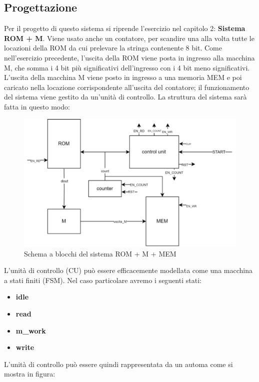 \subsection{Progettazione}
Per il progetto di questo sistema si riprende l'esercizio nel capitolo 2: \textbf{Sistema ROM + M}. Viene usato anche un contatore, per scandire una alla volta tutte le locazioni della ROM da cui prelevare la stringa contenente 8 bit. Come nell'esercizio precedente, l'uscita della ROM viene posta in ingresso alla macchina M, che somma i 4 bit più significativi dell'ingresso con i 4 bit meno significativi. L'uscita della macchina M viene posto in ingresso a una memoria MEM e poi caricato nella locazione corrispondente all'uscita del contatore; il funzionamento del sistema viene gestito da un'unità di controllo.  
La struttura del sistema sarà fatta in questo modo:
\begin{figure}[H]
	\centering
	\includegraphics[width=1\textwidth]{img/ROM_M_MEM.png}
	\caption{Schema a blocchi del sistema ROM + M + MEM}
	\label{shf_reg_beh_sim} 
\end{figure}
L'unità di controllo (CU) può essere efficacemente modellata come una macchina a stati finiti (FSM). Nel caso particolare avremo i seguenti stati:
\begin{itemize}
    \item \textbf{idle}
    \item \textbf{read}
    \item \textbf{m\_work}
    \item \textbf{write}
\end{itemize}
L'unità di controllo può essere quindi rappresentata da un automa come si mostra in figura:
